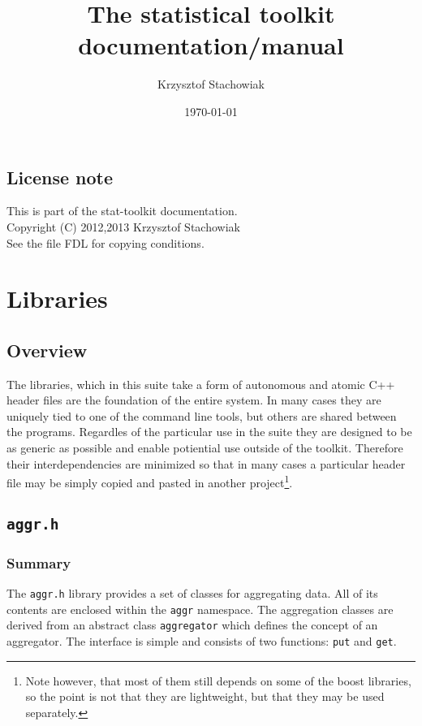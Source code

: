 \documentclass{report}
\begin{document}
\title{The statistical toolkit documentation/manual}
\author{Krzysztof Stachowiak}
\date{\today}

\maketitle

\tableofcontents

\section*{License note}
This is part of the stat-toolkit documentation.\\
Copyright (C) 2012,2013 Krzysztof Stachowiak\\
See the file FDL for copying conditions.

\chapter{Libraries}


\section{Overview}
The libraries, which in this suite take a form of autonomous and atomic C++
header files are the foundation of the entire system. In many cases they are
uniquely tied to one of the command line tools, but others are shared between
the programs. Regardles of the particular use in the suite they are designed to
be as generic as possible and enable potiential use outside of the toolkit.
Therefore their interdependencies are minimized so that in many cases a
particular header file may be simply copied and pasted in another
project\footnote{Note however, that most of them still depends on some of the boost
libraries, so the point is not that they are lightweight, but that they may be
used separately.}.

\section{\texttt{aggr.h}}

	\subsection{Summary}
	The \texttt{aggr.h} library provides a set of classes for aggregating data.
	All of its contents are enclosed within the \texttt{aggr} namespace. The
	aggregation classes are derived from an abstract class \texttt{aggregator}
	which defines the concept of an aggregator. The interface is simple and
	consists of two functions: \texttt{put} and \texttt{get}.
\end{document}
